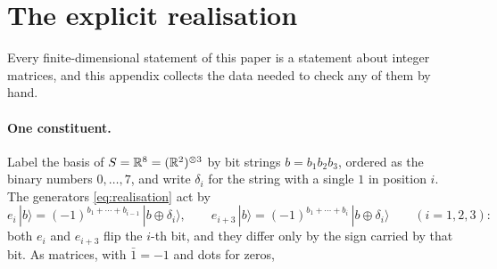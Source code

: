 \section{The explicit realisation}
\label{app:realisation}

Every finite-dimensional statement of this paper is a statement about integer matrices, and this appendix collects the data needed to check any of them by hand.

\paragraph{One constituent.} Label the basis of $S=\mathbb{R}^8=(\mathbb{R}^2)^{\otimes3}$ by bit strings $b=b_1b_2b_3$, ordered as the binary numbers $0,\dots,7$, and write $\delta_i$ for
the string with a single $1$ in position $i$. The generators \eqref{eq:realisation} act by
\[
e_i\,|b\rangle=(-1)^{b_1+\cdots+b_{i-1}}\,|b\oplus\delta_i\rangle,\qquad e_{i+3}\,|b\rangle=(-1)^{b_1+\cdots+b_i}\,|b\oplus\delta_i\rangle\qquad(i=1,2,3):
\]
both $e_i$ and $e_{i+3}$ flip the $i$-th bit, and they differ only by the sign carried by that bit. As matrices, with $\bar1=-1$ and dots for zeros,
